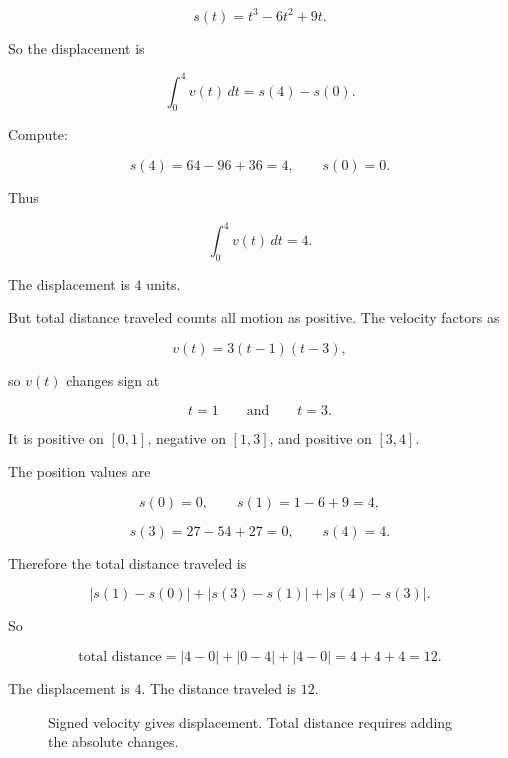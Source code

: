 \[
s(t)=t^3-6t^2+9t.
\]

So the displacement is

\[
\int_0^4 v(t)\,dt
=
s(4)-s(0).
\]

Compute:

\[
s(4)=64-96+36=4,
\qquad
s(0)=0.
\]

Thus

\[
\boxed{
\int_0^4 v(t)\,dt=4.
}
\]

The displacement is \(4\) units.

But total distance traveled counts all motion as positive.  The velocity factors as

\[
v(t)=3(t-1)(t-3),
\]

so \(v(t)\) changes sign at

\[
t=1
\qquad\text{and}\qquad
t=3.
\]

It is positive on \([0,1]\), negative on \([1,3]\), and positive on \([3,4]\).

The position values are

\[
s(0)=0,
\qquad
s(1)=1-6+9=4,
\]

\[
s(3)=27-54+27=0,
\qquad
s(4)=4.
\]

Therefore the total distance traveled is

\[
|s(1)-s(0)|+|s(3)-s(1)|+|s(4)-s(3)|.
\]

So

\[
\text{total distance}
=
|4-0|+|0-4|+|4-0|
=
4+4+4
=
12.
\]

The displacement is \(4\).  The distance traveled is \(12\).

\begin{figure}[h]
\centering
{}
\caption{Signed velocity gives displacement.  Total distance requires adding the absolute changes.}
\label{fig:velocity-net-change-sign}
\end{figure}

